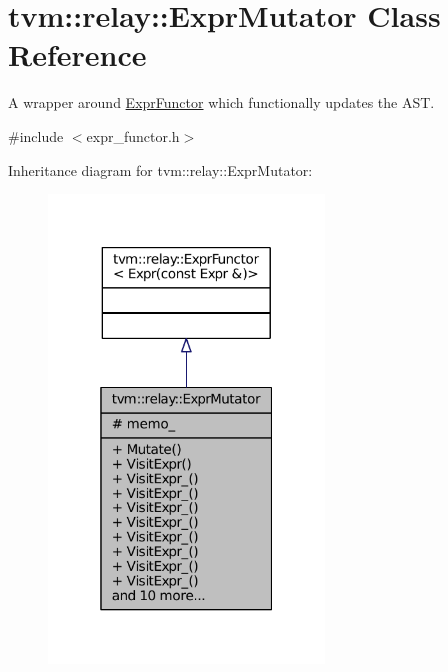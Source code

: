 \hypertarget{classtvm_1_1relay_1_1ExprMutator}{}\section{tvm\+:\+:relay\+:\+:Expr\+Mutator Class Reference}
\label{classtvm_1_1relay_1_1ExprMutator}


A wrapper around \hyperlink{classtvm_1_1relay_1_1ExprFunctor}{Expr\+Functor} which functionally updates the A\+ST.  




{\ttfamily \#include $<$expr\+\_\+functor.\+h$>$}



Inheritance diagram for tvm\+:\+:relay\+:\+:Expr\+Mutator\+:
\nopagebreak
\begin{figure}[H]
\begin{center}
\leavevmode
\includegraphics[width=208pt]{classtvm_1_1relay_1_1ExprMutator__inherit__graph}
\end{center}
\end{figure}


